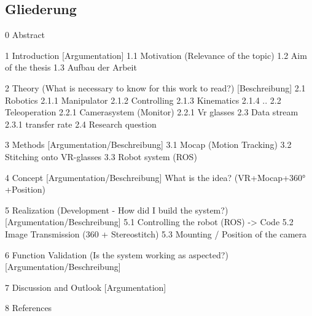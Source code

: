 \subsection{Gliederung}
0 Abstract

1 Introduction [Argumentation]
  1.1 Motivation (Relevance of the topic)
  1.2 Aim of the thesis
  1.3 Aufbau der Arbeit

2 Theory (What is necessary to know for this work to read?) [Beschreibung]
  2.1 Robotics
    2.1.1 Manipulator
    2.1.2 Controlling
    2.1.3 Kinematics
    2.1.4 ..
  2.2 Teleoperation
    2.2.1 Camerasystem (Monitor)
    2.2.1 Vr glasses
  2.3 Data stream
    2.3.1 transfer rate
  2.4 Research question

3 Methods [Argumentation/Beschreibung]
  3.1 Mocap (Motion Tracking)
  3.2 Stitching onto VR-glasses
  3.3 Robot system (ROS)

4 Concept [Argumentation/Beschreibung]
  What is the idea? (VR+Mocap+360°+Position)

5 Realization (Development - How did I build the system?) [Argumentation/Beschreibung]
  5.1 Controlling the robot (ROS) -> Code
  5.2 Image Transmission (360 + Stereostitch)
  5.3 Mounting / Position of the camera

6 Function Validation (Is the system working as aspected?) [Argumentation/Beschreibung]

7 Discussion and Outlook [Argumentation]

8 References

